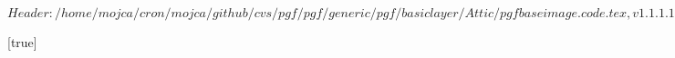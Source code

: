 \ProvidesPackageRCS $Header: /home/mojca/cron/mojca/github/cvs/pgf/pgf/generic/pgf/basiclayer/Attic/pgfbaseimage.code.tex,v 1.1.1.1 2005/06/29 12:14:04 tantau Exp $

%




%
%
%
%
%

\def\pgfdeclareimage{\@ifnextchar[{\pgf@declareimage}{\pgf@declareimage[]}}
\def\pgf@declareimage[#1]#2#3{%
  \setkeys{pgfimage}{height=,width=,page=,interpolate=false,mask=}%
  \setkeys{pgfimage}{#1}%
  \gdef\pgf@filename{}%
  \ifx\pgf@imagepage\@empty%
  \else%
  \expandafter\pgf@findfile\pgfsys@imagesuffixlist:+{#3.page\pgf@imagepage}%
  \fi%
  \ifx\pgf@filename\@empty%
    \expandafter\pgf@findfile\pgfsys@imagesuffixlist:+{#3}%
  \else%
    \setkeys{pgfimage}{page=}%
  \fi%
  \ifx\pgf@filename\@empty%
    \PackageWarning{pgf}%
    {File "#3" not found when defining image "#2".\MessageBreak
      Tried all extensions in "\pgfsys@imagesuffixlist"}%
    \pgf@declaredraftimage{#2}%
  \else%
    \ifpgf@draftmode%
      \pgf@declaredraftimage{#2}%
    \else%
      \pgfsys@defineimage%
    \fi%
  \fi%
  \expandafter\global\expandafter\let\csname pgf@image@#2!\endcsname=\pgf@image%
}

[true]{\edef\pgf@imageinterpolate{/Interpolate #1}}

